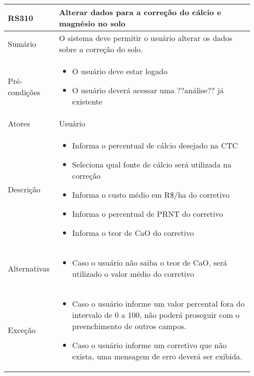 \begin{quadro}[!htb]
    \begin{tabular}{|p{3cm}|p{11cm}|}
        \hline
        \textbf{RS310} & \textbf{Alterar dados para a correção do cálcio e magnésio no solo} \\
        \hline
        Sumário        & O sistema deve permitir o usuário alterar os dados sobre a correção do solo.                  \\
        \hline
        Pré-condições  & \begin{itemize}
            \item O usuário deve estar logado
            \item O usuário deverá acessar uma ??análise?? já existente 
        \end{itemize}                 \\
        \hline
        Atores         & Usuário                  \\
        \hline
        Descrição      &
        \begin{itemize}
            \item Informa o percentual de cálcio desejado na CTC
            \item Seleciona qual fonte de cálcio será utilizada na correção
            \item Informa o custo médio em R\$/ha do corretivo
            \item Informa o percentual de PRNT do corretivo
            \item Informa o teor de CaO do corretivo
        \end{itemize}                 \\
        \hline
        Alternativas   &
        \begin{itemize}
            \item Caso o usuário não saiba o teor de CaO, será utilizado o valor médio do corretivo
        \end{itemize}                 \\
        \hline
        Exceção        &
        \begin{itemize}
            \item Caso o usuário informe um valor percental fora do intervalo de 0 a 100, não poderá proseguir com o preenchimento de outros campos.
            \item Caso o usuário informe um corretivo que não exista, uma mensagem de erro deverá ser exibida.
        \end{itemize}                   \\
        \hline
    \end{tabular}
\end{quadro}

